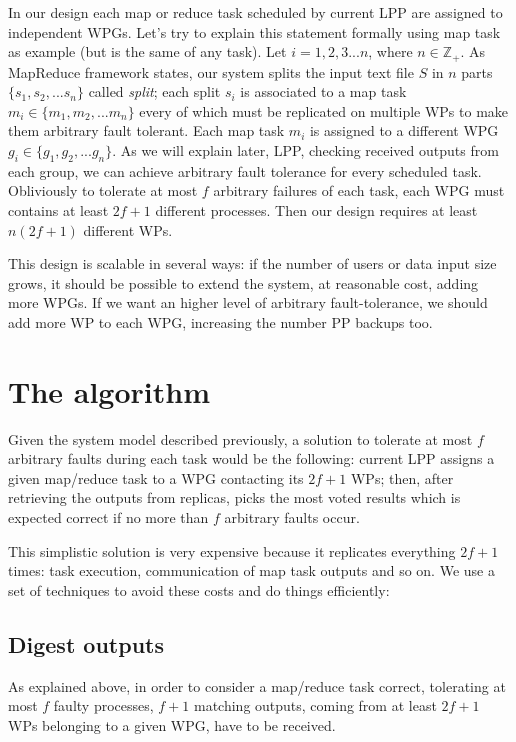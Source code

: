 \documentclass[sigchi]{acmart}
\begin{document}
In our design each map or reduce task scheduled by current LPP are assigned to independent WPGs. Let's try to explain this statement formally using map task as example (but is the same of any task). Let $i = 1,2,3...n$, where $n \in \mathbb{Z}_+$. As MapReduce framework states, our system splits the input text file $S$ in $n$ parts $\lbrace s_1, s_2, ... s_n \rbrace$ called \textit{split}; each split $s_i$ is associated to a map task $m_i \in \lbrace m_1, m_2, ... m_n \rbrace$ every of which must be replicated on multiple WPs to make them arbitrary fault tolerant. Each map task $m_i$ is assigned to a different WPG $g_i \in \lbrace g_1, g_2, ... g_n \rbrace$. As we will explain later, LPP, checking received outputs from each group, we can achieve arbitrary fault tolerance for every scheduled task. Obliviously to tolerate at most $f$ arbitrary failures of each task, each WPG must contains at least $2f+1$ different processes. Then our design requires at least $n(2f+1)$ different WPs.

This design is scalable in several ways: if the number of users or data input size grows, it should be possible to extend the system, at reasonable cost, adding more WPGs. If we want an higher level of arbitrary fault-tolerance, we should add more WP to each WPG, increasing the number PP backups too.

\section{The algorithm}

Given the system model described previously, a solution to tolerate at most $f$ arbitrary faults during each task would be the following: current LPP assigns a given map/reduce task to a WPG contacting its $2f + 1$ WPs; then, after retrieving the outputs from replicas, picks the most voted results which is expected correct if no more than $f$ arbitrary faults occur. 

This simplistic solution is very expensive because it replicates everything $2f + 1$ times: task execution, communication of map task outputs and so on. We use a set of techniques to avoid these costs and do things efficiently:

\subsection{Digest outputs} As explained above, in order to consider a map/reduce task correct, tolerating at most $f$ faulty processes, $f + 1$ matching outputs, coming from at least $2f + 1$ WPs belonging to a given WPG,  have to be received. 
\end{document}
